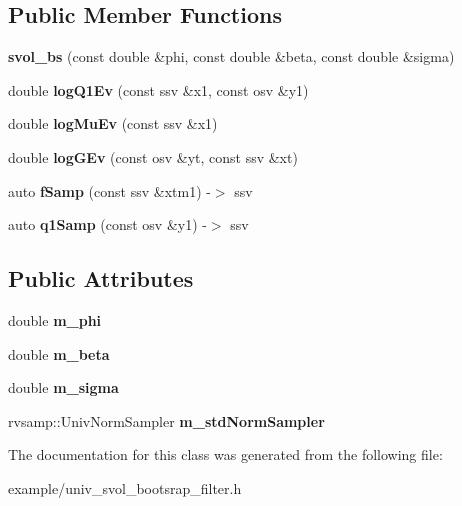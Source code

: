 \subsection*{Public Member Functions}
\begin{DoxyCompactItemize}
\item 
\mbox{\label{classsvol__bs_a732fd48dc72387fa792c969bd4a7318d}} 
{\bfseries svol\+\_\+bs} (const double \&phi, const double \&beta, const double \&sigma)
\item 
\mbox{\label{classsvol__bs_aae36729af9543e86cfca34b6a4c901a1}} 
double {\bfseries log\+Q1\+Ev} (const ssv \&x1, const osv \&y1)
\item 
\mbox{\label{classsvol__bs_a08e5fc3ae6560fe5d5ebf1498e972234}} 
double {\bfseries log\+Mu\+Ev} (const ssv \&x1)
\item 
\mbox{\label{classsvol__bs_ab92198d54517c9dca2f0028440f140be}} 
double {\bfseries log\+G\+Ev} (const osv \&yt, const ssv \&xt)
\item 
\mbox{\label{classsvol__bs_a4546fb765228621313fc5ad8834e4cdf}} 
auto {\bfseries f\+Samp} (const ssv \&xtm1) -\/$>$ ssv
\item 
\mbox{\label{classsvol__bs_ac4e7a7ec8738284184be1649eaf084f1}} 
auto {\bfseries q1\+Samp} (const osv \&y1) -\/$>$ ssv
\end{DoxyCompactItemize}
\subsection*{Public Attributes}
\begin{DoxyCompactItemize}
\item 
\mbox{\label{classsvol__bs_a7f69d783f885e301c80e7d166c3a5610}} 
double {\bfseries m\+\_\+phi}
\item 
\mbox{\label{classsvol__bs_a9dba552e4de89bc488c7780866776129}} 
double {\bfseries m\+\_\+beta}
\item 
\mbox{\label{classsvol__bs_a594300257a3784ba41114f74d1c1e37d}} 
double {\bfseries m\+\_\+sigma}
\item 
\mbox{\label{classsvol__bs_adb58cc515aec2185434ae6b4639a1e02}} 
rvsamp\+::\+Univ\+Norm\+Sampler {\bfseries m\+\_\+std\+Norm\+Sampler}
\end{DoxyCompactItemize}


The documentation for this class was generated from the following file\+:\begin{DoxyCompactItemize}
\item 
example/univ\+\_\+svol\+\_\+bootsrap\+\_\+filter.\+h\end{DoxyCompactItemize}
